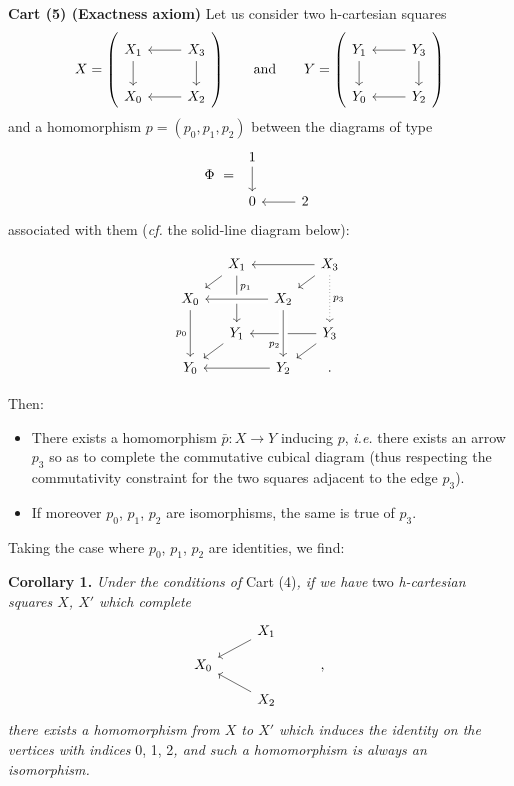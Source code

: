 \documentclass[11pt]{article}
\newcommand{\printedpage}[1]{\marginpar{\footnotesize p.~#1}}
\newcommand{\msp}[1]{\marginpar{\footnotesize [#1]}}
\begin{document}
\printedpage{4}

\textbf{Cart (5) (Exactness axiom)} Let us consider two h-cartesian squares
\[
X = \left(\begin{tikzcd}
X_1 \ar[d] & X_3 \ar[l] \ar[d] \\
X_0 & X_2 \ar[l]
\end{tikzcd}\right)
\qquad \text{and} \qquad
Y = \left(\begin{tikzcd}
Y_1 \ar[d] & Y_3 \ar[l] \ar[d] \\
Y_0 & Y_2 \ar[l]
\end{tikzcd}\right)
\]
and a homomorphism $p = (p_0, p_1, p_2)$ between the diagrams of type
\[
\Phi \ = \
\begin{tikzcd}
1 \ar[d] & \\
0 & 2 \ar[l]
\end{tikzcd}
\]
associated with them (\textit{cf.} the solid-line diagram below):

\msp{page 5}
\[
\begin{tikzcd}[row sep=small, column sep=small]
& X_1 \ar[dl] \ar[dd, "p_1" near start] & & X_3 \ar[ll] \ar[dl] \ar[dd, dotted, "p_3"] \\
X_0 \ar[dd, "p_0"'] & & X_2 \ar[ll, crossing over] & \\
& Y_1 \ar[dl] & & Y_3 \ar[ll] \ar[dl] \\
Y_0 & & Y_2 \ar[ll] \ar[from=uu, crossing over, "p_2"' near end] & .
\end{tikzcd}
\]

Then:
\begin{itemize}[leftmargin=2.5em]
\item[a)] There exists a homomorphism $\bar{p} : X \longrightarrow Y$ inducing $p$, \textit{i.e.} there exists an arrow $p_3$ so as to complete the commutative cubical diagram (thus respecting the commutativity constraint for the two squares adjacent to the edge $p_3$).
\item[b)] If moreover $p_0$, $p_1$, $p_2$ are isomorphisms, the same is true of $p_3$.
\end{itemize}

Taking the case where $p_0$, $p_1$, $p_2$ are identities, we find:

\textbf{Corollary 1.} \textit{Under the conditions of} Cart (4)\textit{, if we have} two \textit{h-cartesian squares $X$, $X'$ which complete}
\[
\begin{tikzcd}[row sep=small]
& X_1 \ar[dl] & \\
X_0 & & , \\
& X_2 \ar[ul] &
\end{tikzcd}
\]
\textit{there exists a homomorphism from $X$ to $X'$ which induces the identity on the vertices with indices} 0, 1, 2\textit{, and such a homomorphism is always an isomorphism.}
\end{document}
